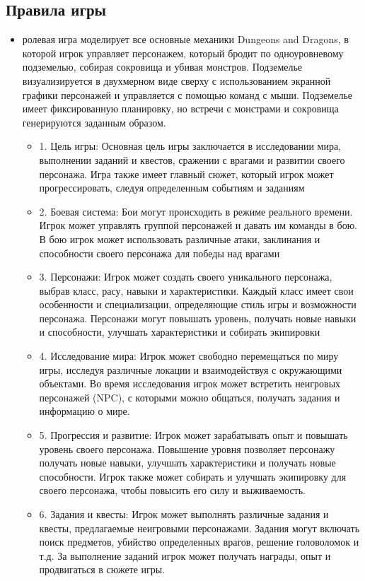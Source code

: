\subsection{Правила игры}
 \begin{itemize}
 	\item ролевая игра моделирует все основные механики Dungeons and Dragons, в которой игрок управляет персонажем, который бродит по одноуровневому подземелью, собирая сокровища и убивая монстров. Подземелье визуализируется в двухмерном виде сверху с использованием экранной графики персонажей и управляется с помощью команд с мыши. Подземелье имеет фиксированную планировку, но встречи с монстрами и сокровища генерируются заданным образом.
 	\begin{itemize}
 		\item 1. Цель игры: Основная цель игры заключается в исследовании мира, выполнении заданий и квестов, сражении с врагами и развитии своего персонажа. Игра также имеет главный сюжет, который игрок может прогрессировать, следуя определенным событиям и заданиям
 		\item 2. Боевая система:  Бои могут происходить в режиме реального времени. Игрок может управлять группой персонажей и давать им команды в бою. В бою игрок может использовать различные атаки, заклинания и способности своего персонажа для победы над врагами
 		\item 3. Персонажи: Игрок может создать своего уникального персонажа, выбрав класс, расу, навыки и характеристики. Каждый класс имеет свои особенности и специализации, определяющие стиль игры и возможности персонажа. Персонажи могут повышать уровень, получать новые навыки и способности, улучшать характеристики и собирать экипировки
 		\item 4. Исследование мира: Игрок может свободно перемещаться по миру игры, исследуя различные локации и взаимодействуя с окружающими объектами. Во время исследования игрок может встретить неигровых персонажей (NPC), с которыми можно общаться, получать задания и информацию о мире.
 		\item 5. Прогрессия и развитие: Игрок может зарабатывать опыт и повышать уровень своего персонажа. Повышение уровня позволяет персонажу получать новые навыки, улучшать характеристики и получать новые способности. Игрок также может собирать и улучшать экипировку для своего персонажа, чтобы повысить его силу и выживаемость.
 		\item 6. Задания и квесты: Игрок может выполнять различные задания и квесты, предлагаемые неигровыми персонажами. Задания могут включать поиск предметов, убийство определенных врагов, решение головоломок и т.д. За выполнение заданий игрок может получать награды, опыт и продвигаться в сюжете игры.
 	\end{itemize}
 \end{itemize}
 
